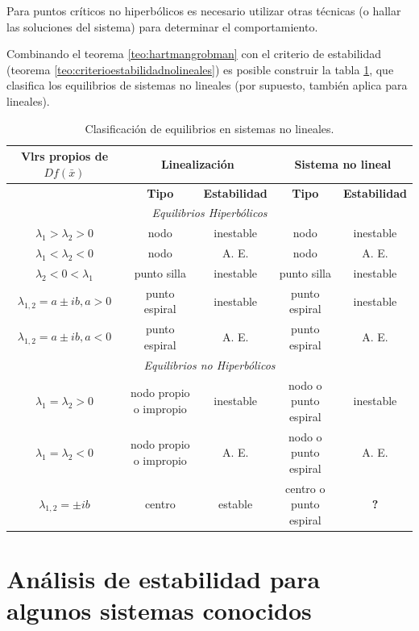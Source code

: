 \documentclass[11pt]{book}
\theoremstyle{definition}
\numberwithin{definition}{section}
\theoremstyle{theorem}
\numberwithin{theorem}{section}
\numberwithin{lemma}{section}
\numberwithin{corollary}{section}
\theoremstyle{plain}
\numberwithin{example}{section}
\begin{document}
Para puntos críticos no hiperbólicos es necesario utilizar otras técnicas (o hallar las soluciones del sistema) para determinar el comportamiento.

Combinando el teorema \ref{teo:hartmangrobman} con el criterio de estabilidad (teorema \ref{teo:criterioestabilidadnolineales}) es posible construir la tabla \ref{tab:clasificacionequilibrios}, que clasifica los equilibrios de sistemas no lineales (por supuesto, también aplica para lineales).

\begin{table}[ht!]
	\begin{tabular}{|c|c|c|c|c|}
		\hline
		\textbf{Vlrs propios de $Df(\bar{x})$} & \multicolumn{2}{|c|}{\textbf{Linealización}} & \multicolumn{2}{|c|}{\textbf{Sistema no lineal}} \\
		\hline
		 & \textbf{Tipo} &\textbf{Estabilidad} & \textbf{Tipo} & \textbf{Estabilidad} \\
		\hline
		\multicolumn{5}{|c|}{\textit{Equilibrios Hiperbólicos}} \\
		\hline
		$\lambda_1 > \lambda_2 > 0$ & nodo & inestable & nodo & inestable \\
		$\lambda_1 < \lambda_2 < 0$ & nodo & A. E. & nodo & A. E. \\
		$\lambda_2 < 0 < \lambda_1$ & punto silla & inestable & punto silla & inestable \\
		$\lambda_{1,2} = a \pm ib, a > 0$ & punto espiral & inestable & punto espiral & inestable \\
		$\lambda_{1,2} = a \pm ib, a < 0$ & punto espiral & A. E. & punto espiral & A. E. \\

		\hline
		\multicolumn{5}{|c|}{\textit{Equilibrios no Hiperbólicos}} \\
		\hline
		$\lambda_1 = \lambda_2 >0$ & nodo propio o impropio & inestable & nodo o punto espiral & inestable \\
		$\lambda_1 = \lambda_2 < 0$ & nodo propio o impropio & A. E. & nodo o punto espiral & A. E. \\
		$\lambda_{1,2} = \pm ib$ & centro & estable & centro o punto espiral & \textbf{?} \\
		\hline
	\end{tabular}
	\label{tab:clasificacionequilibrios}
	\caption{Clasificación de equilibrios en sistemas no lineales.}
\end{table}

\section{Análisis de estabilidad para algunos sistemas conocidos}
\end{document}
